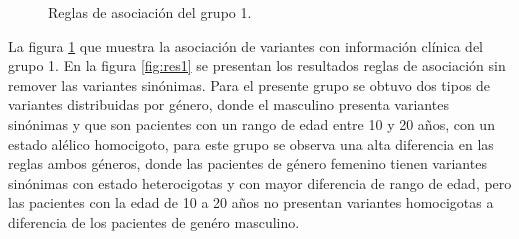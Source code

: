 \begin{figure}[h!]
	\centering
	\caption{Reglas de asociación del grupo 1. }
	\label{fig:reglas1}
\end{figure}

La figura \ref{fig:reglas1} que muestra la asociación de variantes con información clínica del grupo 1. En la figura \ref{fig:res1} se presentan los resultados reglas de asociación sin remover las variantes sinónimas. Para el presente grupo se obtuvo dos tipos de variantes  distribuidas por género, donde el masculino presenta variantes  sinónimas y que son pacientes con un rango de edad entre 10 y 20 años, con un estado alélico homocigoto, para este grupo se observa una alta diferencia en las reglas ambos géneros, donde las pacientes de género femenino tienen variantes sinónimas con estado heterocigotas y con mayor diferencia de rango  de edad, pero las pacientes con la edad de 10 a 20 años no presentan variantes homocigotas a diferencia de los pacientes de genéro masculino. \\

